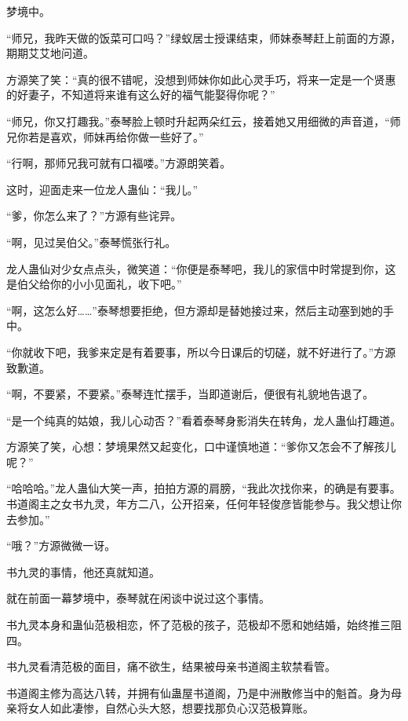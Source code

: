 
\begin{this_body}

梦境中。

“师兄，我昨天做的饭菜可口吗？”绿蚁居士授课结束，师妹泰琴赶上前面的方源，期期艾艾地问道。

方源笑了笑：“真的很不错呢，没想到师妹你如此心灵手巧，将来一定是一个贤惠的好妻子，不知道将来谁有这么好的福气能娶得你呢？”

“师兄，你又打趣我。”泰琴脸上顿时升起两朵红云，接着她又用细微的声音道，“师兄你若是喜欢，师妹再给你做一些好了。”

“行啊，那师兄我可就有口福喽。”方源朗笑着。

这时，迎面走来一位龙人蛊仙：“我儿。”

“爹，你怎么来了？”方源有些诧异。

“啊，见过吴伯父。”泰琴慌张行礼。

龙人蛊仙对少女点点头，微笑道：“你便是泰琴吧，我儿的家信中时常提到你，这是伯父给你的小小见面礼，收下吧。”

“啊，这怎么好……”泰琴想要拒绝，但方源却是替她接过来，然后主动塞到她的手中。

“你就收下吧，我爹来定是有着要事，所以今日课后的切磋，就不好进行了。”方源致歉道。

“啊，不要紧，不要紧。”泰琴连忙摆手，当即道谢后，便很有礼貌地告退了。

“是一个纯真的姑娘，我儿心动否？”看着泰琴身影消失在转角，龙人蛊仙打趣道。

方源笑了笑，心想：梦境果然又起变化，口中谨慎地道：“爹你又怎会不了解孩儿呢？”

“哈哈哈。”龙人蛊仙大笑一声，拍拍方源的肩膀，“我此次找你来，的确是有要事。书道阁主之女书九灵，年方二八，公开招亲，任何年轻俊彦皆能参与。我父想让你去参加。”

“哦？”方源微微一讶。

书九灵的事情，他还真就知道。

就在前面一幕梦境中，泰琴就在闲谈中说过这个事情。

书九灵本身和蛊仙范极相恋，怀了范极的孩子，范极却不愿和她结婚，始终推三阻四。

书九灵看清范极的面目，痛不欲生，结果被母亲书道阁主软禁看管。

书道阁主修为高达八转，并拥有仙蛊屋书道阁，乃是中洲散修当中的魁首。身为母亲将女人如此凄惨，自然心头大怒，想要找那负心汉范极算账。


\end{this_body}
